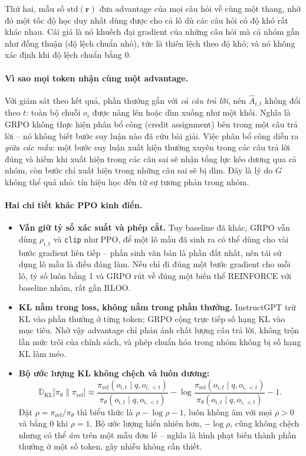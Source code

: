 Thứ hai, mẫu số $\text{std}(\mathbf{r})$ đưa advantage của mọi câu hỏi về cùng một thang, nhờ đó một tốc độ học duy nhất dùng được cho cả lô dù các câu hỏi có độ khó rất khác nhau. Cái giá là nó khuếch đại gradient của những câu hỏi mà cả nhóm gần như đồng thuận (độ lệch chuẩn nhỏ), tức là thiên lệch theo độ khó; và nó không xác định khi độ lệch chuẩn bằng 0.

\paragraph{Vì sao mọi token nhận cùng một advantage.}
Với giám sát theo kết quả, phần thưởng gắn với \emph{cả câu trả lời}, nên $\hat{A}_{i,t}$ không đổi theo $t$: toàn bộ chuỗi $o_i$ được nâng lên hoặc dìm xuống như một khối. Nghĩa là GRPO không thực hiện phân bổ công (credit assignment) bên trong một câu trả lời -- nó không biết bước suy luận nào đã cứu bài giải. Việc phân bổ công diễn ra \emph{giữa các mẫu}: một bước suy luận xuất hiện thường xuyên trong các câu trả lời đúng và hiếm khi xuất hiện trong các câu sai sẽ nhận tổng lực kéo dương qua cả nhóm, còn bước chỉ xuất hiện trong những câu sai sẽ bị dìm. Đây là lý do $G$ không thể quá nhỏ: tín hiệu học đến từ sự tương phản trong nhóm.

\paragraph{Hai chi tiết khác PPO kinh điển.}
\begin{itemize}
	\item \textbf{Vẫn giữ tỷ số xác suất và phép cắt.} Tuy baseline đã khác, GRPO vẫn dùng $\rho_{i,t}$ và \texttt{clip} như PPO, để một lô mẫu đã sinh ra có thể dùng cho vài bước gradient liên tiếp -- phần sinh văn bản là phần đắt nhất, nên tái sử dụng lô mẫu là điều đáng làm. Nếu chỉ đi đúng một bước gradient cho mỗi lô, tỷ số luôn bằng 1 và GRPO rút về đúng một biến thể REINFORCE với baseline nhóm, rất gần RLOO.
	\item \textbf{KL nằm trong loss, không nằm trong phần thưởng.} InstructGPT trừ KL vào phần thưởng ở từng token; GRPO cộng trực tiếp số hạng KL vào mục tiêu. Nhờ vậy advantage chỉ phản ánh chất lượng câu trả lời, không trộn lẫn mức trôi của chính sách, và phép chuẩn hóa trong nhóm không bị số hạng KL làm méo.
	\item \textbf{Bộ ước lượng KL không chệch và luôn dương:}
	\[
	\mathbb{D}_{\text{KL}}\big[\pi_\theta\|\pi_{\text{ref}}\big] \approx \frac{\pi_{\text{ref}}(o_{i,t}\mid q, o_{i,<t})}{\pi_\theta(o_{i,t}\mid q, o_{i,<t})} - \log\frac{\pi_{\text{ref}}(o_{i,t}\mid q, o_{i,<t})}{\pi_\theta(o_{i,t}\mid q, o_{i,<t})} - 1.
	\]
	Đặt $\rho = \pi_{\text{ref}}/\pi_\theta$ thì biểu thức là $\rho - \log\rho - 1$, luôn không âm với mọi $\rho > 0$ và bằng 0 khi $\rho = 1$. Bộ ước lượng hiển nhiên hơn, $-\log\rho$, cũng không chệch nhưng có thể \emph{âm} trên một mẫu đơn lẻ -- nghĩa là hình phạt biến thành phần thưởng ở một số token, gây nhiễu không cần thiết.
\end{itemize}

